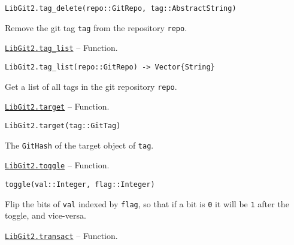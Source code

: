 \begin{adjustwidth}{2em}{0pt}


\begin{verbatim}
LibGit2.tag_delete(repo::GitRepo, tag::AbstractString)
\end{verbatim}

Remove the git tag \texttt{tag} from the repository \texttt{repo}.



\end{adjustwidth}
\hypertarget{7061472492129884254}{} 
\hyperlink{7061472492129884254}{\texttt{LibGit2.tag\_list}}  -- {Function.}

\begin{adjustwidth}{2em}{0pt}


\begin{verbatim}
LibGit2.tag_list(repo::GitRepo) -> Vector{String}
\end{verbatim}

Get a list of all tags in the git repository \texttt{repo}.



\end{adjustwidth}
\hypertarget{14775566063016633781}{} 
\hyperlink{14775566063016633781}{\texttt{LibGit2.target}}  -- {Function.}

\begin{adjustwidth}{2em}{0pt}


\begin{verbatim}
LibGit2.target(tag::GitTag)
\end{verbatim}

The \texttt{GitHash} of the target object of \texttt{tag}.



\end{adjustwidth}
\hypertarget{6271025014547744112}{} 
\hyperlink{6271025014547744112}{\texttt{LibGit2.toggle}}  -- {Function.}

\begin{adjustwidth}{2em}{0pt}


\begin{verbatim}
toggle(val::Integer, flag::Integer)
\end{verbatim}

Flip the bits of \texttt{val} indexed by \texttt{flag}, so that if a bit is \texttt{0} it will be \texttt{1} after the toggle, and vice-versa.



\end{adjustwidth}
\hypertarget{11557958455666787225}{} 
\hyperlink{11557958455666787225}{\texttt{LibGit2.transact}}  -- {Function.}

